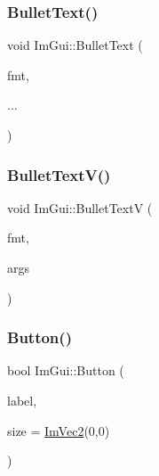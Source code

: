 \subsubsection{\texorpdfstring{Bullet\+Text()}{BulletText()}}
{\footnotesize\ttfamily void Im\+Gui\+::\+Bullet\+Text (\begin{DoxyParamCaption}\item[{const char $\ast$}]{fmt,  }\item[{}]{... }\end{DoxyParamCaption})}

\hypertarget{namespace_im_gui_af8f4b5e96c745e205974857f9a584583}{}\label{namespace_im_gui_af8f4b5e96c745e205974857f9a584583} 
\subsubsection{\texorpdfstring{Bullet\+Text\+V()}{BulletTextV()}}
{\footnotesize\ttfamily void Im\+Gui\+::\+Bullet\+TextV (\begin{DoxyParamCaption}\item[{const char $\ast$}]{fmt,  }\item[{va\+\_\+list}]{args }\end{DoxyParamCaption})}

\hypertarget{namespace_im_gui_a38094c568ce398db5a3abb9d3ac92030}{}\label{namespace_im_gui_a38094c568ce398db5a3abb9d3ac92030} 
\subsubsection{\texorpdfstring{Button()}{Button()}}
{\footnotesize\ttfamily bool Im\+Gui\+::\+Button (\begin{DoxyParamCaption}\item[{const char $\ast$}]{label,  }\item[{const \hyperlink{struct_im_vec2}{Im\+Vec2} \&}]{size = {\ttfamily \hyperlink{struct_im_vec2}{Im\+Vec2}(0,0)} }\end{DoxyParamCaption})}

\hypertarget{namespace_im_gui_a65a4f18b1bc8ce0f351687922089f374}{}\label{namespace_im_gui_a65a4f18b1bc8ce0f351687922089f374} 
